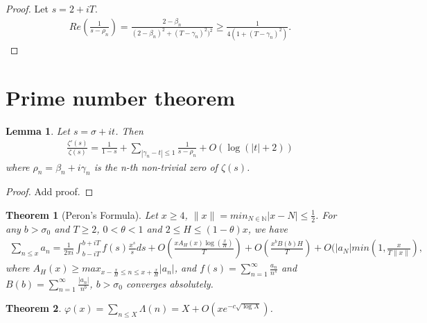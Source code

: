 \documentclass[a4paper,10pt]{amsart}
\newtheorem{theorem}{Theorem}[section]
\newtheorem{lemma}{Lemma}[section]
\newcommand{\N}{\mathbb N} %
\begin{document}
\begin{proof}
    Let $s = 2 + iT$.
    \begin{align*}
        Re(\frac{1}{s - \rho_n}) = 
        \frac{2 - \beta_n}{(2-\beta_n)^{2} + (T-\gamma_n)^{2})^2} 
        \geq \frac{1}{4(1+(T-\gamma_n)^2)}.
   \end{align*} 
\end{proof}

\section{Prime number theorem}

\begin{lemma}
   Let $s = \sigma + it$. Then
   \begin{align*}
       \frac{\zeta'(s)}{\zeta(s)} = \frac{1}{1-s} + 
       \sum_{|\gamma_n -t| \leq 1} \frac{1}{s-\rho_n} + O(\log (|t|+2))
   \end{align*}
   where $\rho_n = \beta_n + i \gamma_n$ is the n-th non-trivial zero of
   $\zeta(s)$.
\end{lemma}

\begin{proof}
   Add proof. 
\end{proof}

\begin{theorem}[Peron's Formula]
Let $x \geq 4$, $\|x\| = min_{N \in \N}|x-N| \leq \frac{1}{2}$.
For any $b > \sigma_0$ and $T \geq 2$, $0 < \theta < 1$ and 
$2 \leq H \leq (1-\theta)x$, we have
\begin{align*}
    \sum_{n \leq x} a_n = \frac{1}{2\pi i} \int_{b-iT}^{b+iT}
    f(s)\frac{x^s}{s} ds + O(\frac{x A_{H}(x) \log(\frac{x}{H})}{T})
    + O(\frac{x^{b}B(b)H}{T}) + O(|a_N|min(1, \frac{x}{T\|x\|}),
\end{align*}
where $A_{H}(x) \geq max_{x - \frac{x}{H} \leq n \leq x + \frac{x}{H}}
|a_n|$, and $f(s) = \sum_{n=1}^{\infty}\frac{a_n}{n^s}$ and
$B(b) = \sum_{n=1}^{\infty}\frac{|a_n|}{n^b}$, $b > \sigma_0$ converges
absolutely.
\end{theorem}

\begin{theorem}
    $\varphi(x) =  \sum_{n \leq X}\Lambda(n) = X + O(xe^{-c\sqrt{\log X}})$.
\end{theorem}
\end{document}
